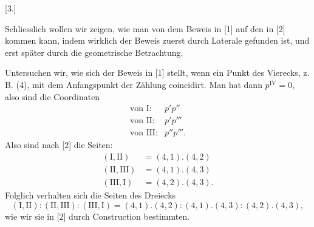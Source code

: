 
\begin{center}
[3.]
\end{center}

Schliesslich wollen wir zeigen, wie man von dem Beweis in [1] auf den in [2] kommen kann, indem
wirklich der Beweis zuerst durch Laterale gefunden ist, und erst später durch die geometrische
Betrachtung.

Untersuchen wir, wie sich der Beweis in [1] stellt, wenn ein Punkt des Vierecks, z.\,B. (4), mit
dem Anfangspunkt der Zählung coincidirt. Man hat dann $p^{\mathrm{IV}} = 0$, also sind die
Coordinaten
\[
\begin{array}{rl}
\text{von I:} & p'p'' \\
\text{von II:} & p'p''' \\
\text{von III:} & p''p'''.
\end{array}
\]
Also sind nach [2] die Seiten:
\[
\begin{array}{rl}
(\text{I}, \text{II}) & = (4,1) . (4,2) \\
(\text{II}, \text{III}) & = (4,1) . (4,3) \\
(\text{III}, \text{I}) & = (4,2) . (4,3).
\end{array}
\]
Folglich verhalten sich die Seiten des Dreiecks
\[
(\text{I}, \text{II}) : (\text{II}, \text{III}) : (\text{III}, \text{I}) = (4,1) . (4,2) :
(4,1) . (4,3) : (4,2) . (4,3),
\]
wie wir sie in [2] durch Construction bestimmten.
